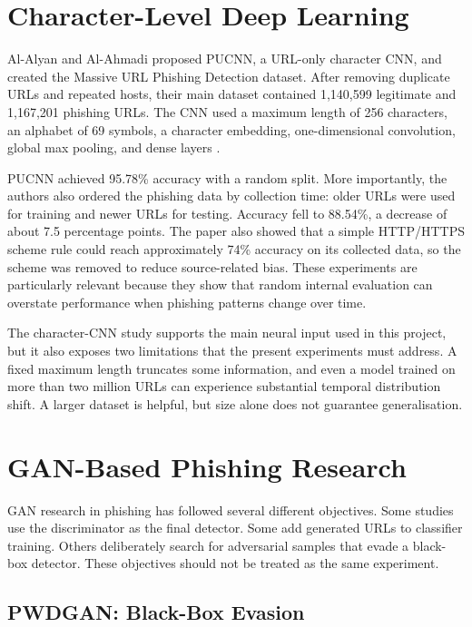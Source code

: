 \section{Character-Level Deep Learning}

Al-Alyan and Al-Ahmadi proposed PUCNN, a URL-only character CNN, and created the
Massive URL Phishing Detection dataset. After removing duplicate URLs and
repeated hosts, their main dataset contained 1,140,599 legitimate and 1,167,201
phishing URLs. The CNN used a maximum length of 256 characters, an alphabet of
69 symbols, a character embedding, one-dimensional convolution, global max
pooling, and dense layers \citep{alalyan2020robust}.

PUCNN achieved 95.78\% accuracy with a random split. More importantly, the
authors also ordered the phishing data by collection time: older URLs were used
for training and newer URLs for testing. Accuracy fell to 88.54\%, a decrease of
about 7.5 percentage points. The paper also showed that a simple HTTP/HTTPS
scheme rule could reach approximately 74\% accuracy on its collected data, so
the scheme was removed to reduce source-related bias. These experiments are
particularly relevant because they show that random internal evaluation can
overstate performance when phishing patterns change over time.

The character-CNN study supports the main neural input used in this project,
but it also exposes two limitations that the present experiments must address.
A fixed maximum length truncates some information, and even a model trained on
more than two million URLs can experience substantial temporal distribution
shift. A larger dataset is helpful, but size alone does not guarantee
generalisation.

\section{GAN-Based Phishing Research}

GAN research in phishing has followed several different objectives. Some
studies use the discriminator as the final detector. Some add generated URLs to
classifier training. Others deliberately search for adversarial samples that
evade a black-box detector. These objectives should not be treated as the same
experiment.

\subsection{PWDGAN: Black-Box Evasion}

